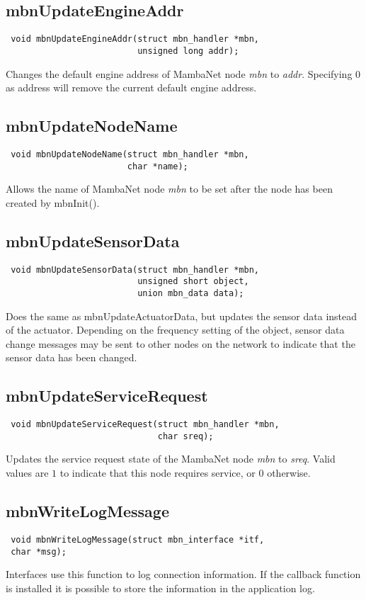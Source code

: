 \subsection{mbnUpdateEngineAddr}
\begin{verbatim}
 void mbnUpdateEngineAddr(struct mbn_handler *mbn,
                          unsigned long addr);
\end{verbatim}
Changes the default engine address of MambaNet node \textit{mbn} to \textit{addr}. Specifying $0$ as address will remove the current default engine address.


\subsection{mbnUpdateNodeName}
\begin{verbatim}
 void mbnUpdateNodeName(struct mbn_handler *mbn,
                        char *name);
\end{verbatim}
Allows the name of MambaNet node \textit{mbn} to be set after the node has been created by mbnInit().


\subsection{mbnUpdateSensorData}
\begin{verbatim}
 void mbnUpdateSensorData(struct mbn_handler *mbn,
                          unsigned short object,
                          union mbn_data data);
\end{verbatim}
Does the same as mbnUpdateActuatorData, but updates the sensor data instead of the actuator. Depending on the frequency setting of the object, sensor data change messages may be sent to other nodes on the network to indicate that the sensor data has been changed.


\subsection{mbnUpdateServiceRequest}
\begin{verbatim}
 void mbnUpdateServiceRequest(struct mbn_handler *mbn,
                              char sreq);
\end{verbatim}
Updates the service request state of the MambaNet node \textit{mbn} to \textit{sreq}. Valid values are $1$ to indicate that this node requires service, or $0$ otherwise.


\subsection{mbnWriteLogMessage}
\begin{verbatim}
 void mbnWriteLogMessage(struct mbn_interface *itf,
 char *msg);
\end{verbatim}
Interfaces use this function to log connection information. If the callback function is installed it is possible to store the information in the application log.


